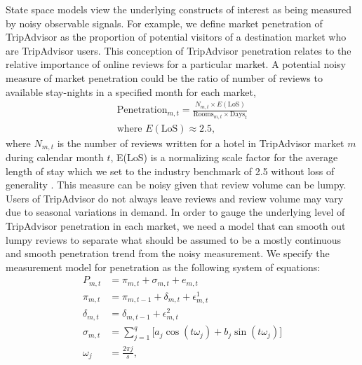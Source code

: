 \documentclass[12pt, leqno]{article}
\begin{document}
State space models view the underlying constructs of interest as being measured by noisy observable signals. For example, we define market penetration of TripAdvisor as the proportion of potential visitors of a destination market who are TripAdvisor users. This conception of TripAdvisor penetration relates to the relative importance of online reviews for a particular market. A potential noisy measure of market penetration could be the ratio of number of reviews to available stay-nights in a specified month for each market,
\begin{equation}\label{eq:penetration}
\begin{split}
\text{Penetration}_{m,t}=\frac{N_{m,t}\times E({\text{LoS}})}{\text{Rooms}_{m,t}\times \text{Days}_t} \\
\text{where } E({\text{LoS}})\approx 2.5,
\end{split}
\end{equation}
where $N_{m,t}$ is the number of reviews written for a hotel in TripAdvisor market $m$ during calendar month $t$, E(LoS) is a normalizing scale factor for the average length of stay which we set to the industry benchmark of 2.5 without loss of generality \citep{expediapackage2017}. This measure can be noisy given that review volume can be lumpy. Users of TripAdvisor do not always leave reviews and review volume may vary due to seasonal variations in demand. In order to gauge the underlying level of TripAdvisor penetration in each market, we need a model that can smooth out lumpy reviews to separate what should be assumed to be a mostly continuous and smooth penetration trend from the noisy measurement. We specify the measurement model for penetration as the following system of equations:
\begin{equation}\label{eq:penetration_dlm}
\begin{split}
P_{m,t}&=\pi_{m,t}+\sigma_{m,t}+e_{m,t}\\
\pi_{m,t}&=\pi_{m,t-1}+\delta_{m,t}+\epsilon_{m,t}^{1} \\
\delta_{m,t} &= \delta_{m,t-1} +\epsilon_{m,t}^{2} \\
\sigma_{m,t} &= \sum_{j=1}^{q}\big[a_j\cos(t\omega_j)+b_j\sin(t\omega_j)\big] \\
\omega_j &= \frac{2\pi j}{s},
\end{split}
\end{equation}
\end{document}
